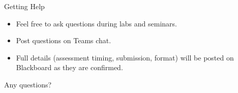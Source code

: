 \documentclass[10pt]{beamer}
\begin{document}
\begin{titledslide}{Getting Help}

  \begin{itemize}
  \item Feel free to ask questions during labs and seminars.
  \item Post questions on Teams chat.
  \item Full details (assessment timing, submission, format) will be
    posted on Blackboard as they are confirmed.
  \end{itemize}

\end{titledslide}
\begin{frame}
\vfill
\begin{center}
\Huge Any questions?
\end{center}
\vfill
\end{frame}
\end{document}
